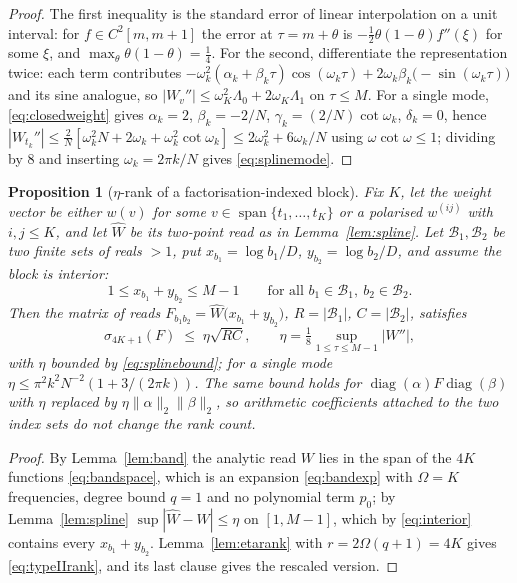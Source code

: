 \documentclass[11pt,a4paper]{article}
\theoremstyle{plain}
\newtheorem{proposition}[theorem]{Proposition}
\theoremstyle{definition}
\DeclareMathOperator{\diag}{diag}
\begin{document}
\begin{proof}
The first inequality is the standard error of linear interpolation on a unit
interval: for $f\in C^{2}[m,m+1]$ the error at $\tau=m+\theta$ is
$-\tfrac12\theta(1-\theta)f''(\xi)$ for some $\xi$, and
$\max_\theta\theta(1-\theta)=\tfrac14$. For the second, differentiate the
representation twice: each term contributes
$-\omega_k^{2}(\alpha_k+\beta_k\tau)\cos(\omega_k\tau)
+2\omega_k\beta_k\bigl(-\sin(\omega_k\tau)\bigr)$ and its sine analogue, so
$|W_v''|\le\omega_K^{2}\Lambda_0+2\omega_K\Lambda_1$ on $\tau\le M$. For a
single mode, \eqref{eq:closedweight} gives
$\alpha_k=2$, $\beta_k=-2/N$, $\gamma_k=(2/N)\cot\omega_k$, $\delta_k=0$, hence
$|W_{t_k}''|\le\tfrac2N[\omega_k^{2}N+2\omega_k+\omega_k^{2}\cot\omega_k]
\le2\omega_k^{2}+6\omega_k/N$ using $\omega\cot\omega\le1$; dividing by $8$ and
inserting $\omega_k=2\pi k/N$ gives \eqref{eq:splinemode}.
\end{proof}

\begin{proposition}[$\eta$-rank of a factorisation-indexed block]
\label{prop:typeII}
Fix $K$, let the weight vector be either $w(v)$ for some
$v\in\operatorname{span}\{t_1,\dots,t_K\}$ or a polarised $w^{(ij)}$ with
$i,j\le K$, and let $\widehat W$ be its two-point read as in
Lemma~\ref{lem:spline}. Let $\mathcal B_1,\mathcal B_2$ be two finite sets of
reals $>1$, put $x_{b_1}=\log b_1/D$, $y_{b_2}=\log b_2/D$, and assume the block
is \emph{interior}:
\begin{equation}
\label{eq:interior}
  1\le x_{b_1}+y_{b_2}\le M-1
  \qquad\text{for all } b_1\in\mathcal B_1,\ b_2\in\mathcal B_2 .
\end{equation}
Then the matrix of reads
$F_{b_1b_2}=\widehat W\bigl(x_{b_1}+y_{b_2}\bigr)$, $R=|\mathcal B_1|$,
$C=|\mathcal B_2|$, satisfies
\begin{equation}
\label{eq:typeIIrank}
  \sigma_{4K+1}(F)\;\le\;\eta\sqrt{RC},
  \qquad
  \eta=\tfrac18\sup_{1\le\tau\le M-1}|W''| ,
\end{equation}
with $\eta$ bounded by \eqref{eq:splinebound}; for a single mode
$\eta\le\pi^{2}k^{2}N^{-2}(1+3/(2\pi k))$. The same bound holds for
$\diag(\alpha)F\diag(\beta)$ with $\eta$ replaced by
$\eta\lVert\alpha\rVert_2\lVert\beta\rVert_2$, so arithmetic coefficients
attached to the two index sets do not change the rank count.
\end{proposition}

\begin{proof}
By Lemma~\ref{lem:band} the analytic read $W$ lies in the span of the $4K$
functions \eqref{eq:bandspace}, which is an expansion \eqref{eq:bandexp} with
$\Omega=K$ frequencies, degree bound $q=1$ and no polynomial term $p_0$; by
Lemma~\ref{lem:spline} $\sup|\widehat W-W|\le\eta$ on $[1,M-1]$, which by
\eqref{eq:interior} contains every $x_{b_1}+y_{b_2}$. Lemma~\ref{lem:etarank}
with $r=2\Omega(q+1)=4K$ gives \eqref{eq:typeIIrank}, and its last clause gives
the rescaled version.
\end{proof}
\end{document}
